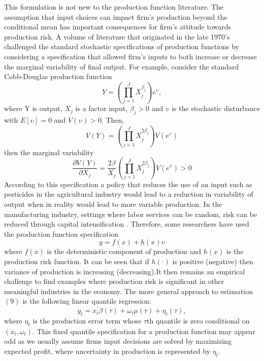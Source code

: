\documentclass{article}
\begin{document}
This formulation is not new to the production function literature. The assumption that input choices can impact firm's production beyond the conditional mean has important consequences for firm's attitude towards production risk. A volume of literature that originated in the late 1970's challenged the standard stochastic specifications of production functions \citep{Just1978,Just1979} by considering a specification that allowed firm's inputs to both increase or decrease the marginal variability of final output. For example, consider the standard Cobb-Douglas production function 
\begin{equation*}
    Y=(\prod_{j=1}^{J}X_{j}^{\beta_{j}})e^{\upsilon},
\end{equation*}
where Y is output, $X_{j}$ is a factor input, $\beta_{j}>0$ and $\upsilon$ is the stochastic disturbance with $E[\upsilon]=0$ and $V(\upsilon)>0$. Then,
\begin{equation*} 
    V(Y)=(\prod_{j=1}^{J}X_{j}^{2\beta_{j}})V(e^{\upsilon})
\end{equation*}
then the marginal variability
\begin{equation*}
    \frac{\partial V(Y)}{\partial X_{j}}=\frac{2\beta}{X_{j}}(\prod_{j=1}^{J}X_{j}^{2\beta_{j}})V(e^{\upsilon})>0
\end{equation*}
According to this specification a policy that reduces the use of an input such as pesticides in the agricultural industry would lead to a reduction in variability of output when in reality would lead to more variable production. In the manufacturing industry, settings where labor services can be random, risk can be reduced through capital intensification \citep{Pope1979}. Therefore, some researchers have used the \cite{Just1978} production function specification
\begin{equation} \label{pf-risk}
    y=f(x)+h(x)\upsilon
\end{equation}
where $f(x)$ is the deterministic component of production and $h(x)$ is the production risk function. It can be seen that if $h(\cdot)$ is positive (negative) then variance of production is increasing (decreasing).It then remains an empirical challenge to find examples where production risk is significant in other meaningful industries in the economy. The more general approach to estimation $(9)$ is the following linear quantile regression: \\

\begin{equation}\label{singleq}
	y_{t}=x_{t}^{'}\beta(\tau)+\omega_{t}\mu(\tau)+\eta_{t}(\tau),
\end{equation}
where $\eta_{t}$ is the production error term whose $\tau$th quantile is zero conditional on $(x_{t},\omega_{t})$. This fixed quantile specification for a production function may appear odd as we usually assume firms input decisions are solved by maximizing expected profit, where uncertainty in production is represented by $\eta_{t}$.\\ 
\end{document}
